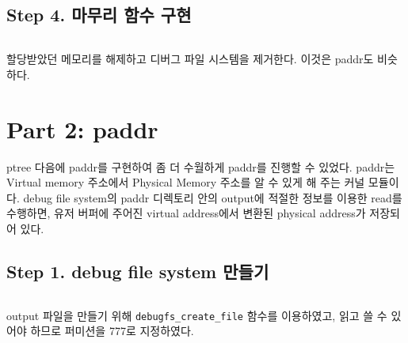 \documentclass{report}
\begin{document}
\subsection{Step 4. 마무리 함수 구현}
\inputminted[firstline=159,lastline=169, linenos, breaklines, obeytabs=true,tabsize=4]{C}{../kernellab-handout-done/ptree/dbfs_ptree.c}
할당받았던 메모리를 해제하고 디버그 파일 시스템을 제거한다. 이것은 paddr도 비슷하다.

\section{Part 2: paddr}

ptree 다음에 paddr를 구현하여 좀 더 수월하게 paddr를 진행할 수 있었다. paddr는 Virtual memory 주소에서 Physical Memory 주소를 알 수 있게 해 주는 커널 모듈이다. debug file system의 paddr 디렉토리 안의 output에 적절한 정보를 이용한 read를 수행하면, 유저 버퍼에 주어진 virtual address에서 변환된 physical address가 저장되어 있다.
 
\subsection{Step 1. debug file system 만들기}
\inputminted[firstline=54,lastline=77, linenos, breaklines, obeytabs=true,tabsize=4]{C}{../kernellab-handout-done/paddr/dbfs_paddr.c}
output 파일을 만들기 위해 \lstinline{debugfs_create_file} 함수를 이용하였고,  읽고 쓸 수 있어야 하므로 퍼미션을 777로 지정하였다.
\end{document}
